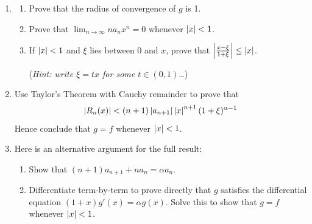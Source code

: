 \begin{exercises}
\begin{enumerate}
\begin{enumerate}
	 	  \item\begin{enumerate}
	 	    \item Prove that the radius of convergence of $g$ is 1.
	 	  	\item Prove that $\lim_{n\to\infty}na_nx^n=0$ whenever $\left| x\right|<1$.
	 	  	\item If $\left| x\right|<1$ and $\xi$ lies between 0 and $x$, prove that $\left| \frac{x-\xi}{1+\xi}\right|\le\left| x\right|$.\par
	 	  	(\emph{Hint: write $\xi=tx$ for some $t\in(0,1)$\ldots})
	 	  \end{enumerate}
	 	  
	 	  \item Use Taylor's Theorem with Cauchy remainder to prove that
	 	  \[
	 	  	\left| R_n(x)\right|< (n+1)\left| a_{n+1}\right|\left| x\right|^{n+1}(1+\xi)^{\alpha-1}
	 	  \]
	 	  Hence conclude that $g=f$ whenever $\left| x\right|<1$.
	 	  
	 	  \item Here is an alternative argument for the full result:
	 	  \begin{enumerate}
	 	    \item Show that $(n+1)a_{n+1}+na_n=\alpha a_n$.
	 	    \item Differentiate term-by-term to prove directly that $g$ satisfies the differential equation $(1+x)g'(x)=\alpha g(x)$. Solve this to show that $g=f$ whenever $\left| x\right|<1$.
	 	  \end{enumerate}
	 	\end{enumerate}
	 	
	\end{enumerate}
\end{exercises}



 
% 
% 


